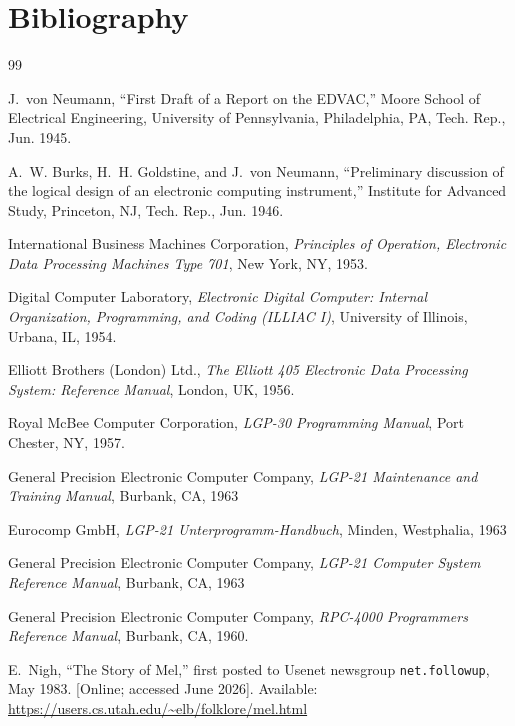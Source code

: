 \section{Bibliography}
\raggedright
\begin{thebibliography}{99}

J.~von Neumann, ``First Draft of a Report on the EDVAC,'' Moore School of Electrical Engineering, University of Pennsylvania, Philadelphia, PA, Tech. Rep., Jun. 1945.

A.~W. Burks, H.~H. Goldstine, and J.~von Neumann, ``Preliminary discussion of the logical design of an electronic computing instrument,'' Institute for Advanced Study, Princeton, NJ, Tech. Rep., Jun. 1946.

International Business Machines Corporation, \emph{Principles of Operation, Electronic Data Processing Machines Type 701}, New York, NY, 1953.

Digital Computer Laboratory, \emph{Electronic Digital Computer: Internal Organization, Programming, and Coding (ILLIAC I)}, University of Illinois, Urbana, IL, 1954.

Elliott Brothers (London) Ltd., \emph{The Elliott 405 Electronic Data Processing System: Reference Manual}, London, UK, 1956.

Royal McBee Computer Corporation, \emph{LGP-30 Programming Manual}, Port Chester, NY, 1957.

 General Precision Electronic Computer Company, \emph{LGP-21 Maintenance and Training Manual}, Burbank, CA, 1963

 Eurocomp GmbH, \emph{LGP-21 Unterprogramm-Handbuch}, Minden, Westphalia, 1963

 General Precision Electronic Computer Company, \emph{LGP-21 Computer System Reference Manual}, Burbank, CA, 1963

General Precision Electronic Computer Company, \emph{RPC-4000 Programmers Reference Manual}, Burbank, CA, 1960.

E.~Nigh, ``The Story of Mel,'' first posted to Usenet newsgroup \texttt{net.followup}, May 1983. [Online; accessed June 2026]. Available: \url{https://users.cs.utah.edu/\~elb/folklore/mel.html}
\end{thebibliography}
